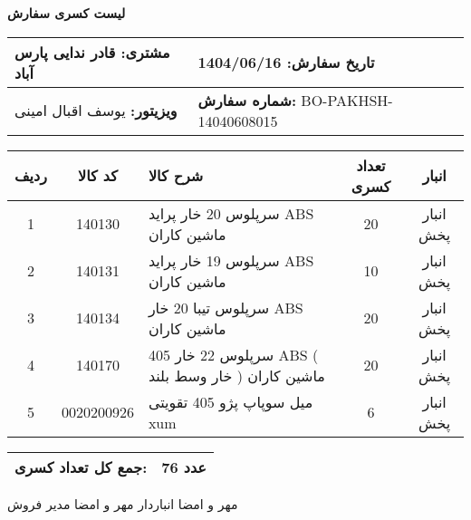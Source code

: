 \documentclass[a4paper,12pt]{article}
\begin{document}
\begin{center}
    {\Huge \textbf{   لیست کسری سفارش   }} \\
\end{center}

\vspace{0.5cm}

\noindent
\begin{tabular}{|p{7cm}|p{7cm}|}
\hline
\textbf{مشتری:} قادر ندایی پارس آباد & \textbf{تاریخ سفارش:} 1404/06/16 \\
\hline
\textbf{ویزیتور:} یوسف اقبال امینی & \textbf{شماره سفارش:} BO-PAKHSH-14040608015 \\
\hline
\end{tabular}

\vspace{0.5cm}

\begin{longtable}{|c|c|p{6cm}|c|c|}
\hline
\rowcolor{headerblue} \color{white}
\textbf{ردیف} &  \textbf{کد کالا} & \textbf{شرح کالا} & \textbf{تعداد کسری} & \textbf{انبار} \\
\hline
\endhead
1 & 140130 & سرپلوس 20 خار پرايد ABS ماشين کاران & 20 & انبار پخش \\
\hline
2 & 140131 & سرپلوس 19 خار پرايد ABS ماشين کاران & 10 & انبار پخش \\
\hline
3 & 140134 & سرپلوس تيبا 20 خار ABS ماشين کاران & 20 & انبار پخش \\
\hline
4 & 140170 & سرپلوس 22 خار 405 ABS ( خار وسط بلند ) ماشين کاران & 20 & انبار پخش \\
\hline
5 & 0020200926 & میل سوپاپ پژو 405 تقویتی xum & 6 & انبار پخش \\
\hline

\end{longtable}

\vspace{0.3cm}
\noindent
\begin{tabular}{|p{7cm}|p{7cm}|}
\hline
\textbf{جمع کل تعداد کسری:} & 76 عدد \\
\hline
\end{tabular}

\vspace{1.5cm}

\noindent
مهر و امضا انباردار \hspace{8cm} مهر و امضا مدیر فروش
\end{document}
